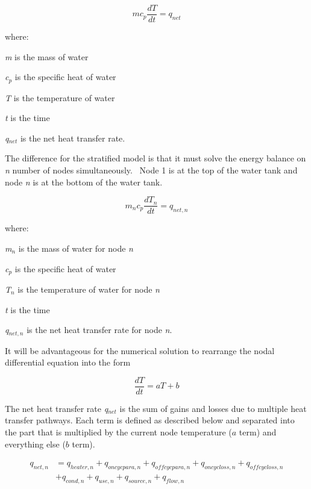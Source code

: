 \begin{equation}
m{c_p}\frac{{dT}}{{dt}} = {q_{net}}
\end{equation}

where:

\emph{m} is the mass of water

\emph{c\(_{p}\)} is the specific heat of water

\emph{T} is the temperature of water

\emph{t} is the time

\emph{q\(_{net}\)} is the net heat transfer rate.

The difference for the stratified model is that it must solve the energy balance on \emph{n} number of nodes simultaneously.~ Node 1 is at the top of the water tank and node \emph{n} is at the bottom of the water tank.

\begin{equation}
{m_n}{c_p}\frac{{d{T_n}}}{{dt}} = {q_{net,n}}
\end{equation}

where:

\emph{m\(_{n}\)} is the mass of water for node \emph{n}

\emph{c\(_{p}\)} is the specific heat of water

\emph{T\(_{n}\)} is the temperature of water for node \emph{n}

\emph{t} is the time

\emph{q\(_{net,n}\)} is the net heat transfer rate for node \emph{n}.

It will be advantageous for the numerical solution to rearrange the nodal differential equation into the form

\begin{equation}
  \frac{d{T}}{dt} = a T + b
\end{equation}

The net heat transfer rate \emph{q\(_{net}\)} is the sum of gains and losses due to multiple heat transfer pathways. Each term is defined as described below and separated into the part that is multiplied by the current node temperature ($a$ term) and everything else ($b$ term).

\begin{equation}
  \begin{array}{ll}
    q_{net,n} &= q_{heater,n} + q_{oncycpara,n} + q_{offcycpara,n} + q_{oncycloss,n} + q_{offcycloss,n} \\
              &+ q_{cond,n} + q_{use,n} + q_{source,n} + q_{flow,n}
  \end{array}
\end{equation}

